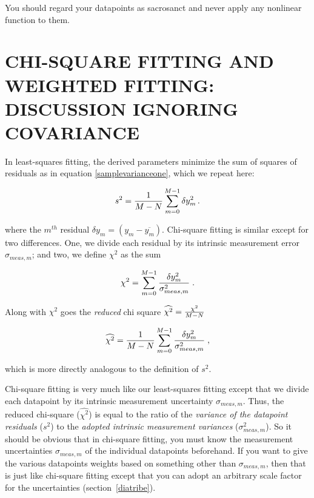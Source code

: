 \documentclass[psfig,preprint]{aastex}
\begin{document}
	You should regard your datapoints as sacrosanct and never apply
any nonlinear function to them.

\section{CHI-SQUARE FITTING AND WEIGHTED FITTING: DISCUSSION IGNORING
COVARIANCE } \label{chisqsection}

	In least-squares fitting, the derived parameters minimize the sum of
squares of residuals as in equation \ref{samplevarianceone}, which we
repeat here:

$$ s^2 = {1 \over M - N} \sum_{m=0}^{M-1} \delta y_m^2 \, . $$

\noindent where the $m^{th}$ residual $\delta y_m = (y_m -
\overline{y_m})$.  Chi-square fitting is similar except for two
differences.  One, we divide each residual by its intrinsic measurement
error $\sigma_{meas,m}$; and two, we define $\chi^2$ as the sum

\begin{mathletters} \label{chisqdefinition}
\begin{equation}
 \chi^2 = \sum_{m=0}^{M-1} {\delta y_m^2
     \over \sigma_{meas,m}^2 } \; . 
\end{equation}

\noindent Along with $\chi^2$ goes the {\it reduced} chi square
$\widehat{\chi^2} = {\chi^2 \over M-N}$

\begin{equation}
\widehat{\chi^2} = {1 \over M - N} \sum_{m=0}^{M-1} {\delta y_m^2
     \over \sigma_{meas,m}^2 } \; , 
\end{equation}
\end{mathletters}

\noindent which is more directly analogous to the definition of $s^2$.

	Chi-square fitting is very much like our least-squares fitting
except that we divide each datapoint by its intrinsic measurement
uncertainty $\sigma_{meas,m}$. Thus, the reduced chi-square
($\widehat{\chi^2}$) is equal to the ratio of the {\it variance of the
datapoint residuals} ($s^2$) to the {\it adopted intrinsic
measurement variances} ($\sigma_{meas,m}^2$).  So it should be obvious
that in chi-square fitting, you must know the measurement uncertainties
$\sigma_{meas,m}$ of the individual datapoints beforehand.  If you want
to give the various datapoints weights based on something other than
$\sigma_{meas,m}$, then that is just like chi-square fitting except that
you can adopt an arbitrary scale factor for the uncertainties
(section~\ref{diatribe}). 
\end{document}
